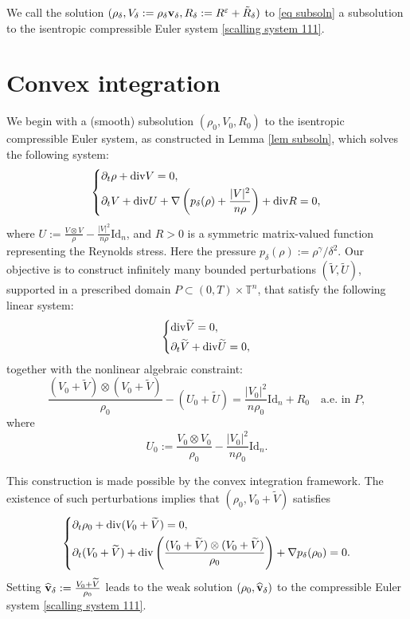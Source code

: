 \documentclass[12pt,reqno]{amsart}
\theoremstyle{definition}
\theoremstyle{remark}
\numberwithin{equation}{section}
\newcommand{\Dv}{{\rm div}}
\newcommand{\id}{\mathrm{Id}}
\renewcommand{\v}{{\bf v}}
\begin{document}
We call the solution $(\rho_\delta, V_\delta := \rho_\delta \v_\delta, R_\delta := R^\varepsilon + \tilde{R}_\delta)$ to \eqref{eq subsoln} a subsolution to the isentropic compressible Euler system \eqref{scalling system 111}.  

\bigskip

\section{Convex integration}\label{sec ci}

We begin with a (smooth) subsolution $(\rho_0, V_0, R_0)$ to the isentropic compressible Euler system, as constructed in Lemma \ref{lem subsoln}, which solves the following system:
\begin{equation}
\left\{
\begin{split}
\label{isentropic equivalent}
&\partial_t\rho + \Dv V = 0, \\
&\partial_t V + \Dv U + \nabla\left(p_\delta(\rho) + \frac{|V|^2}{n\rho}\right) + \Dv R = 0,
\end{split}
\right.
\end{equation}
where $ U := \frac{V \otimes V}{\rho} - \frac{|V|^2}{n\rho} \id_n $, and $ R > 0 $ is a symmetric matrix-valued function representing the Reynolds stress. Here the pressure $p_\delta(\rho) := \rho^\gamma/\delta^2$. Our objective is to construct infinitely many bounded perturbations $ (\widetilde{V}, \widetilde{U}) $, supported in a prescribed domain $ P \subset (0,T) \times \mathbb{T}^n $, that satisfy the following linear system:
\begin{equation}
\label{ci system}
 \left\{
\begin{split}
&\Dv \widetilde{V}=0,\\
&\partial_t\widetilde{V}+\Dv \widetilde{U}=0,
\end{split}\right.
\end{equation} 
together with the nonlinear algebraic constraint:
\begin{equation}
\label{restriction =}
\frac{(V_0 + \widetilde{V}) \otimes (V_0 + \widetilde{V})}{\rho_0} - (U_0 + \widetilde{U}) = \frac{|V_0|^2}{n\rho_0} \id_n + R_0 \quad \text{a.e. in } P,
\end{equation}
where
\begin{equation}
\label{U0 condition}
U_0 := \frac{V_0 \otimes V_0}{\rho_0} - \frac{|V_0|^2}{n\rho_0} \id_n.
\end{equation}

This construction is made possible by the convex integration framework. The existence of such perturbations implies that $(\rho_0, V_0 + \widetilde{V})$ satisfies 
\[
\left\{\begin{split}
& \partial_t \rho_0 + \Dv (V_0 + \widetilde{V}) = 0, \\
& \partial_t (V_0 + \widetilde{V}) + \Dv \left( \frac{(V_0 + \widetilde{V}) \otimes (V_0 + \widetilde{V})}{\rho_0} \right) + \nabla p_\delta(\rho_0) = 0.
\end{split}\right.
\]
Setting $\widehat{\v}_\delta : = \tfrac{V_0 + \widetilde{V}}{\rho_0}$ leads to the weak solution $(\rho_0, \widehat{\v}_\delta)$ 
to the compressible Euler system \eqref{scalling system 111}.
\end{document}
